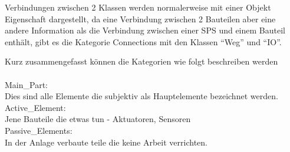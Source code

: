Verbindungen zwischen 2 Klassen werden normalerweise mit einer Objekt Eigenschaft dargestellt, da eine Verbindung zwischen 2 Bauteilen aber eine andere Information als die Verbindung zwischen einer \ac{SPS} und einem Bauteil enthält, gibt es die Kategorie Connections mit den Klassen “Weg” und “IO”.

Kurz zusammengefasst können die Kategorien wie folgt beschreiben werden\\
\\
Main\_Part:\\
	Dies sind alle Elemente die subjektiv als Hauptelemente bezeichnet werden.\\

Active\_Element:\\
	Jene Bauteile die etwas tun - Aktuatoren, Sensoren\\

Passive\_Elements:\\
	In der Anlage verbaute teile die keine Arbeit verrichten.\\ 

